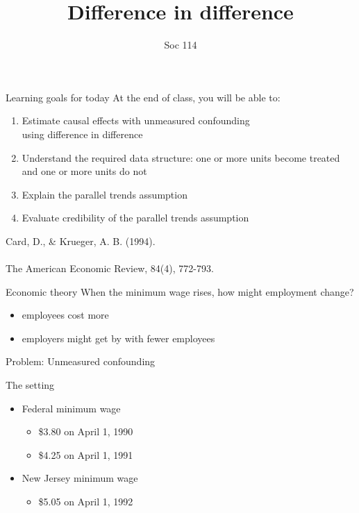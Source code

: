 \documentclass{beamer}
\title{Difference in difference}
\author{Soc 114}
\date{}
\newcommand\bref[2]{\href{#1}{\color{blue}{#2}}}
\newcommand{\goalsframe}{\begin{frame}{Learning goals for today}
At the end of class, you will be able to:
\begin{enumerate}
\item Estimate causal effects with unmeasured confounding\\using difference in difference
\item Understand the required data structure: one or more units become treated and one or more units do not
\item Explain the parallel trends assumption
\item Evaluate credibility of the parallel trends assumption
\end{enumerate}
\end{frame}}
\begin{document}
\maketitle

\goalsframe

\begin{frame}
Card, D., \& Krueger, A. B. (1994).\\\bref{https://davidcard.berkeley.edu/papers/njmin-aer.pdf}{Minimum Wages and Employment: A Case Study of the Fast-Food Industry in New Jersey and Pennsylvania.}\\The American Economic Review, 84(4), 772-793.
\end{frame}

\begin{frame}{Economic theory}
When the minimum wage rises, how might employment change? \pause
\begin{itemize}
\item employees cost more \pause
\item employers might get by with fewer employees
\end{itemize}
\end{frame}

\begin{frame}{Problem: Unmeasured confounding}
\centering
{}

\end{frame}

\begin{frame}{The setting} \pause
\begin{itemize}
\item Federal minimum wage
\begin{itemize}
\item \$3.80 on April 1, 1990
\item \$4.25 on April 1, 1991
\end{itemize} \pause
\item New Jersey minimum wage
\begin{itemize}
\item \$5.05 on April 1, 1992
\end{itemize}
\end{itemize}
\end{frame}
\end{document}
